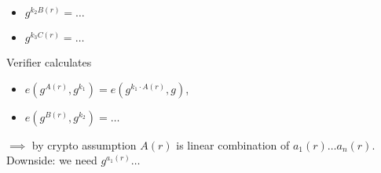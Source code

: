 \documentclass[a4paper, 12pt]{book}
\theoremstyle{definition}
\theoremstyle{remark}
\begin{document}
\begin{itemize}
\begin{itemize}
      \item $g^{k_2 B(r)} = \dots$
      \item $g^{k_3 C(r)} = \dots$
    \end{itemize}
    Verifier calculates
    \begin{itemize}
      \item $e\left(g^{A(r)}, g^{k_1}\right) = e\left(g^{k_1 \cdot A(r)}, g\right)$,
      \item $e\left(g^{B(r)}, g^{k_2}\right) = \dots$
    \end{itemize}
    $\implies$ by crypto assumption $A(r)$ is linear combination of $a_1(r) \dots a_n(r)$. \\
    Downside: we need $g^{a_1(r)} \dots$
\end{itemize}



%
%



\end{document}
